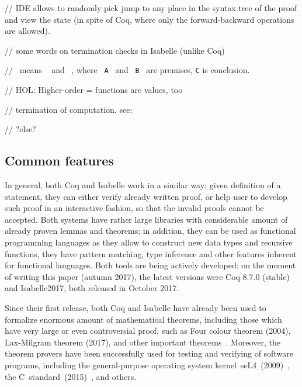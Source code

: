 \documentclass[article]{aaltoseries}
\begin{document}
// IDE allows to randomly pick jump to any place in the syntax tree of the proof and view the state (in spite of Coq, where only the forward-backward operations are allowed).


// some words on termination checks in Isabelle (unlike Coq)

//~ means ~ and ~, where ~\texttt{A}~ and ~\texttt{B}~ are premises, \texttt{C} is conclusion.

// HOL: Higher-order = functions are values, too

// termination of computation. see: %

// ?else?



\subsection{Common features}

In general, both Coq and Isabelle work in a similar way: given definition of a statement, they can either verify already written proof, or help user to develop such proof in an interactive fashion, so that the invalid proofs cannot be accepted. Both systems have rather large libraries with considerable amount of already proven lemmas and theorems; in addition, they can be used as functional programming languages as they allow to construct new data types and recursive functions, they have pattern matching, type inference and other features inherent for functional languages. Both tools are being actively developed: on the moment of writing this paper (autumn 2017), the latest versions were Coq 8.7.0 (stable) and Isabelle2017, both released in October 2017.

Since their first release, both Coq and Isabelle have already been used to formalize enormous amount of mathematical theorems, including those which have very large or even controversial proof, such as Four colour theorem (2004), Lax-Milgram theorem (2017), and other important theorems~\cite{Wiedijk100}. Moreover, the theorem provers have been successfully used for testing and verifying of software programs, including the general-purpose operating system kernel~seL4~(2009)~\cite{Klein09}, the C~standard~(2015)~\cite{Krebbers15}, and others.
\end{document}
